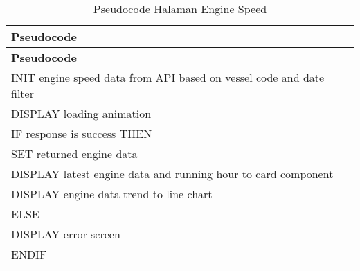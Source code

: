 \begin{longtable}[!h]
  {
          p{}
  }
  \caption{Pseudocode Halaman Engine Speed}
  \label{tab:pseudocode-fe} \\

  \hline
      \bfseries Pseudocode \\ [0.5ex]
  \hline

  \endfirsthead

  \hline
      \bfseries Pseudocode \\ [0.5ex]
  \hline
  \endhead %

  INIT engine speed data from API based on vessel code and date filter \\
  DISPLAY loading animation \\
  IF response is success THEN \\
  \hspace{5mm} SET returned engine data \\
  \hspace{5mm} DISPLAY latest engine data and running hour to card component \\
  \hspace{5mm} DISPLAY engine data trend to line chart \\
  ELSE \\
  \hspace{5mm} DISPLAY error screen \\
  ENDIF \\

  \bottomrule
\end{longtable}